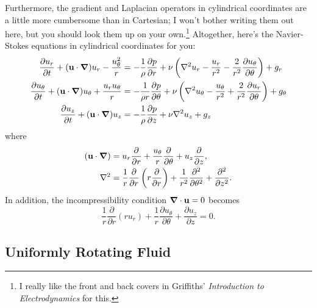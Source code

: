 Furthermore, the gradient and Laplacian operators in cylindrical coordinates are a little more cumbersome than in Cartesian; I won't bother writing them out here, but you should look them up on your own.\footnote{I really like the front and back covers in Griffiths' \emph{Introduction to Electrodynamics} for this.}  Altogether, here's the Navier-Stokes equations in cylindrical coordinates for you:
\begin{align}
\label{eq_ns_r}
\frac {\partial u_{r}}{\partial t} + (\mathbf{u} \cdot \boldsymbol{\nabla}) u_{r} - \frac {u_{\theta}^{2}}{r} & = - \frac {1}{\rho} \frac {\partial p}{\partial r} + \nu \left (\nabla^{2} u_{r} - \frac {u_{r}}{r^{2}} - \frac {2}{r^{2}} \frac {\partial u_{\theta}}{\partial \theta} \right) +  g_r\\
\label{eq_ns_theta}
\frac {\partial u_{\theta}}{\partial t} + (\mathbf{u} \cdot \boldsymbol{\nabla}) u_{\theta} + \frac {u_{r} u_{\theta}}{r} & = - \frac {1}{\rho r} \frac {\partial p}{\partial \theta} + \nu \left (\nabla^{2} u_{\theta} - \frac {u_{\theta}}{r^{2}} + \frac {2}{r^{2}} \frac {\partial u_{r}}{\partial \theta} \right) + g_\theta\\
\label{eq_ns_z}
\frac {\partial u_{z}}{\partial t} + (\mathbf{u} \cdot \boldsymbol{\nabla}) u_{z} & = -\frac {1}{\rho} \frac {\partial p}{\partial z} + \nu \nabla^{2} u_{z} + g_z \\
\end{align}
where
\begin{align}
(\mathbf{u} \cdot \boldsymbol{\nabla}) & = u_{r} \frac {\partial}{\partial r} + \frac {u_{\theta}}{r} \frac {\partial}{\partial \theta} + u_{z} \frac {\partial}{\partial z}, \\
\nabla^{2} & = \frac {1}{r} \frac {\partial}{\partial r} \left (r \frac {\partial}{\partial r} \right) + \frac {1}{r^{2}} \frac {\partial^{2}}{\partial \theta^{2}} + \frac {\partial^{2}}{\partial z^{2}}.
\end{align}
In addition, the incompressibility condition $\boldsymbol{\nabla} \cdot \mathbf{u} = 0$ becomes 
\begin{equation}
\frac {1}{r} \frac {\partial}{\partial r} (r u_{r}) + \frac {1}{r} \frac {\partial u_{\theta}}{\partial \theta} + \frac {\partial u_{z}}{\partial z} = 0.
\end{equation}



\subsection{Uniformly Rotating Fluid}

